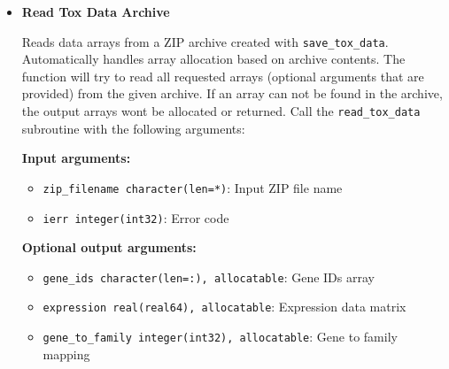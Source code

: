 \documentclass[11pt]{article}
\begin{document}
\begin{enumerate}
\begin{itemize}
	      	      \begin{lstlisting}[language=Fortran, caption={Save Partial Data Archive}]
! Save only gene IDs and expression data
call save_tox_data("expression_only.zip", ierr, &
                  gene_ids=gene_ids, &
                  gene_ids_file="genes.bin", &
                  expression=expr_data, &
                  expression_file="expression.bin")

! Save only family-related data
call save_tox_data("families_only.zip", ierr, &
                  family_ids=family_ids, &
                  family_ids_file="families.bin", &
                  family_centroids=centroids, &
                  family_centroids_file="centroids.bin")
	      	      \end{lstlisting}
	      	      
	      	\item \textbf{Read Tox Data Archive}
	      	      
	      	      Reads data arrays from a ZIP archive created with \texttt{save\_tox\_data}.
	      	      Automatically handles array allocation based on archive contents. The
	      	      function will try to read all requested arrays (optional arguments that
	      	      are provided) from the given archive. If an array can not be found in the
	      	      archive, the output arrays wont be allocated or returned. Call the \texttt{read\_tox\_data}
	      	      subroutine with the following arguments:
	      	      
	      	      \textbf{Input arguments:}
	      	      \begin{itemize}
	      	      	\item \texttt{zip\_filename character(len=*)}: Input ZIP file name
	      	      	      
	      	      	\item \texttt{ierr integer(int32)}: Error code
	      	      \end{itemize}
	      	      \textbf{Optional output arguments:}
	      	      \begin{itemize}
	      	      	\item \texttt{gene\_ids character(len=:), allocatable}: Gene IDs array
	      	      	      
	      	      	\item \texttt{expression real(real64), allocatable}: Expression data
	      	      	      matrix
	      	      	      
	      	      	\item \texttt{gene\_to\_family integer(int32), allocatable}: Gene to
	      	      	      family mapping
	      	      	      

\end{itemize}
\end{itemize}
\end{enumerate}
\end{document}
